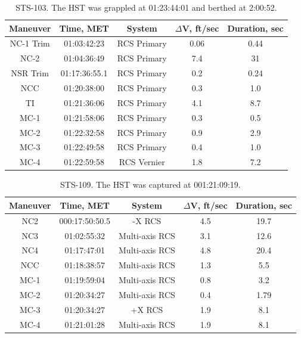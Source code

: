 \documentclass[paper=letter, fontsize=11pt]{scrartcl} %
\numberwithin{equation}{section} %
\numberwithin{figure}{section} %
\numberwithin{table}{section} %
\begin{document}
\begin{table}[H]
\begin{center}
\begin{tabular}{|c |c |c |c |c|}
\hline
Maneuver & Time, MET & System & $\Delta$V, ft/sec & Duration, sec \\
\hline
NC-1 Trim & 01:03:42:23    & RCS Primary & 0.06 & 0.44   \\ \hline
NC-2      & 01:04:36:49    & RCS Primary & 7.4  & 31     \\ \hline
NSR Trim  & 01:17:36:55.1  & RCS Primary & 0.2  & 0.24   \\ \hline
NCC       & 01:20:38:00    & RCS Primary & 0.3  & 1.0    \\ \hline
TI        & 01:21:36:06    & RCS Primary & 4.1  & 8.7    \\ \hline
MC-1      & 01:21:58:06    & RCS Primary & 0.3  & 0.5    \\ \hline
MC-2      & 01:22:32:58    & RCS Primary & 0.9  & 2.9    \\ \hline
MC-3      & 01:22:49:58    & RCS Primary & 0.4  & 1.0    \\ \hline
MC-4      & 01:22:59:58    & RCS Vernier & 1.8  & 7.2    \\ \hline
\end{tabular}
\end{center}
\caption{STS-103. The HST was grappled at 01:23:44:01 and berthed at 2:00:52.}
\end{table}


\begin{table}[H]
\begin{center}
\begin{tabular}{|c |c |c |c |c|}
\hline
Maneuver & Time, MET & System & $\Delta$V, ft/sec & Duration, sec \\
\hline
NC2  & 000:17:50:50.5 & -X RCS & 4.5 & 19.7 \\ \hline
NC3  & 01:02:55:32    & Multi-axis RCS & 3.1 & 12.6 \\ \hline
NC4  & 01:17:47:01    & Multi-axis RCS & 4.8 & 20.4 \\ \hline
NCC  & 01:18:38:57    & Multi-axis RCS & 1.3 & 5.5 \\ \hline
MC-1 & 01:19:59:04    & Multi-axis RCS & 0.8 & 3.2 \\ \hline
MC-2 & 01:20:34:27    & Multi-axis RCS & 0.4 & 1.79 \\ \hline
MC-3 & 01:20:34:27    & +X RCS & 1.9 & 8.1 \\ \hline
MC-4 & 01:21:01:28    & Multi-axis RCS & 1.9 & 8.1 \\ \hline
\end{tabular}
\end{center}
\caption{STS-109. The HST was captured at 001:21:09:19.}
\end{table}
\end{document}
